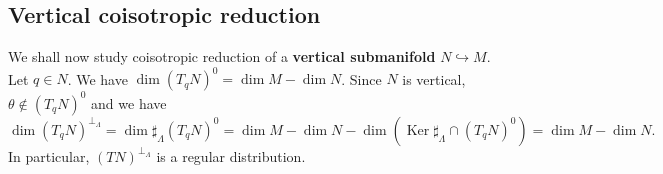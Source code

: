 \documentclass[12pt]{article}
\newtheorem{prop}{Proposition}[section]
\renewcommand{\dim}{\operatorname{dim}}
\renewcommand{\ker}{\operatorname{Ker}}
\begin{document}


\subsection{Vertical coisotropic reduction}
 We shall now study coisotropic reduction of a \textbf{vertical submanifold} $N \hookrightarrow M$. Let $q \in N$. We have $\dim (T_qN)^0 = \dim M - \dim N$. Since $N$ is vertical, $\theta \not \in (T_qN)^0$ and we have $$\dim (T_qN)^{\perp_\Lambda} = \dim \sharp_\Lambda(T_qN)^0 = \dim M - \dim N - \dim (\ker \sharp_\Lambda \cap (T_qN)^0) = \dim M - \dim N.$$ In particular, $(TN)^{\perp_\Lambda}$ is a regular distribution.\\
\end{document}
